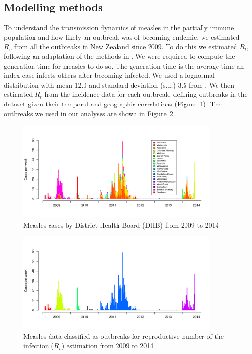 \documentclass{article}
\begin{document}
\begin{itemize}
\subsection{Modelling methods}

To understand the transmission dynamics of measles in the partially immune population and how likely an outbreak was of becoming endemic, we estimated $R_v$ from all the outbreaks in New Zealand since 2009. To do this we estimated $R_t$, following an adaptation of the methods in \citep{obidia12,wallinga4}. We were required to compute the generation time for measles to do so. The generation time is the average time an index case infects others after becoming infected. We used a lognormal distribution with mean 12.0 and standard deviation (s.d.) 3.5 from \citep{klinkenberg11}. We then estimated $R_t$ from the incidence data for each outbreak, defining outbreaks in the dataset given their temporal and geographic correlations (Figure~\ref{fig:dhbcases}). The outbreaks we used in our analyses are shown in Figure~\ref{fig:outbreaks}.

\begin{figure}
     \centering
     \includegraphics[width=0.9\textwidth]{cases_by_dhb_2009_2014.pdf}
     \caption{Measles cases by District Health Board (DHB) from 2009 to 2014}
     \label{fig:dhbcases}
\end{figure}

\begin{figure}
     \centering
     \includegraphics[width=0.9\textwidth]{outbreaks_for_R0.pdf}
     \caption{Measles data classified as outbreaks for reproductive number of the infection ($R_v$) estimation from 2009 to 2014}
     \label{fig:outbreaks}
\end{figure}


\end{itemize}
\end{document}

